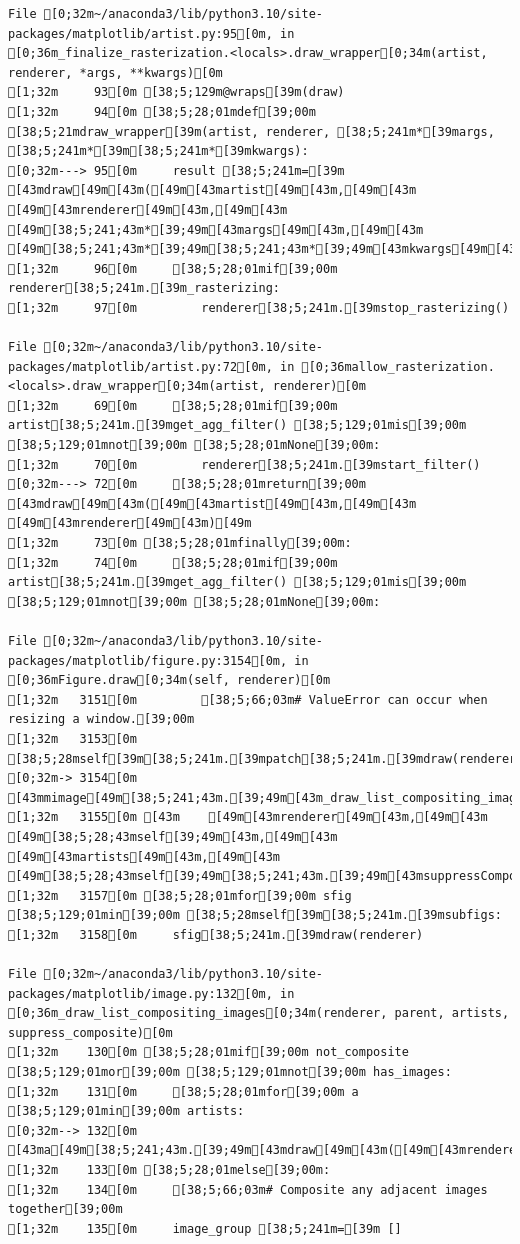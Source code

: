 \documentclass[
  letterpaper,
  DIV=11,
  numbers=noendperiod]{scrartcl}
\begin{document}
\begin{verbatim}
File [0;32m~/anaconda3/lib/python3.10/site-packages/matplotlib/artist.py:95[0m, in [0;36m_finalize_rasterization.<locals>.draw_wrapper[0;34m(artist, renderer, *args, **kwargs)[0m
[1;32m     93[0m [38;5;129m@wraps[39m(draw)
[1;32m     94[0m [38;5;28;01mdef[39;00m [38;5;21mdraw_wrapper[39m(artist, renderer, [38;5;241m*[39margs, [38;5;241m*[39m[38;5;241m*[39mkwargs):
[0;32m---> 95[0m     result [38;5;241m=[39m [43mdraw[49m[43m([49m[43martist[49m[43m,[49m[43m [49m[43mrenderer[49m[43m,[49m[43m [49m[38;5;241;43m*[39;49m[43margs[49m[43m,[49m[43m [49m[38;5;241;43m*[39;49m[38;5;241;43m*[39;49m[43mkwargs[49m[43m)[49m
[1;32m     96[0m     [38;5;28;01mif[39;00m renderer[38;5;241m.[39m_rasterizing:
[1;32m     97[0m         renderer[38;5;241m.[39mstop_rasterizing()

File [0;32m~/anaconda3/lib/python3.10/site-packages/matplotlib/artist.py:72[0m, in [0;36mallow_rasterization.<locals>.draw_wrapper[0;34m(artist, renderer)[0m
[1;32m     69[0m     [38;5;28;01mif[39;00m artist[38;5;241m.[39mget_agg_filter() [38;5;129;01mis[39;00m [38;5;129;01mnot[39;00m [38;5;28;01mNone[39;00m:
[1;32m     70[0m         renderer[38;5;241m.[39mstart_filter()
[0;32m---> 72[0m     [38;5;28;01mreturn[39;00m [43mdraw[49m[43m([49m[43martist[49m[43m,[49m[43m [49m[43mrenderer[49m[43m)[49m
[1;32m     73[0m [38;5;28;01mfinally[39;00m:
[1;32m     74[0m     [38;5;28;01mif[39;00m artist[38;5;241m.[39mget_agg_filter() [38;5;129;01mis[39;00m [38;5;129;01mnot[39;00m [38;5;28;01mNone[39;00m:

File [0;32m~/anaconda3/lib/python3.10/site-packages/matplotlib/figure.py:3154[0m, in [0;36mFigure.draw[0;34m(self, renderer)[0m
[1;32m   3151[0m         [38;5;66;03m# ValueError can occur when resizing a window.[39;00m
[1;32m   3153[0m [38;5;28mself[39m[38;5;241m.[39mpatch[38;5;241m.[39mdraw(renderer)
[0;32m-> 3154[0m [43mmimage[49m[38;5;241;43m.[39;49m[43m_draw_list_compositing_images[49m[43m([49m
[1;32m   3155[0m [43m    [49m[43mrenderer[49m[43m,[49m[43m [49m[38;5;28;43mself[39;49m[43m,[49m[43m [49m[43martists[49m[43m,[49m[43m [49m[38;5;28;43mself[39;49m[38;5;241;43m.[39;49m[43msuppressComposite[49m[43m)[49m
[1;32m   3157[0m [38;5;28;01mfor[39;00m sfig [38;5;129;01min[39;00m [38;5;28mself[39m[38;5;241m.[39msubfigs:
[1;32m   3158[0m     sfig[38;5;241m.[39mdraw(renderer)

File [0;32m~/anaconda3/lib/python3.10/site-packages/matplotlib/image.py:132[0m, in [0;36m_draw_list_compositing_images[0;34m(renderer, parent, artists, suppress_composite)[0m
[1;32m    130[0m [38;5;28;01mif[39;00m not_composite [38;5;129;01mor[39;00m [38;5;129;01mnot[39;00m has_images:
[1;32m    131[0m     [38;5;28;01mfor[39;00m a [38;5;129;01min[39;00m artists:
[0;32m--> 132[0m         [43ma[49m[38;5;241;43m.[39;49m[43mdraw[49m[43m([49m[43mrenderer[49m[43m)[49m
[1;32m    133[0m [38;5;28;01melse[39;00m:
[1;32m    134[0m     [38;5;66;03m# Composite any adjacent images together[39;00m
[1;32m    135[0m     image_group [38;5;241m=[39m []


\end{verbatim}
\end{document}
